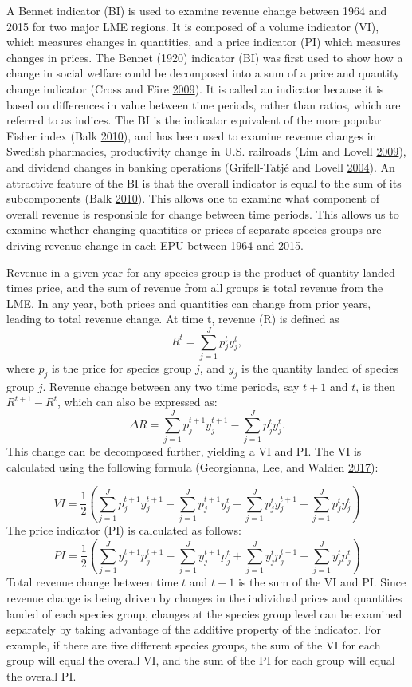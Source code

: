 \documentclass[
]{book}
\begin{document}
A Bennet indicator (BI) is used to examine revenue change between 1964 and 2015 for two major LME regions. It is composed of a volume indicator (VI), which measures changes in quantities, and a price indicator (PI) which measures changes in prices. The Bennet (1920) indicator (BI) was first used to show how a change in social welfare could be decomposed into a sum of a price and quantity change indicator (Cross and Färe \protect\hyperlink{ref-Cross2009}{2009}). It is called an indicator because it is based on differences in value between time periods, rather than ratios, which are referred to as indices. The BI is the indicator equivalent of the more popular Fisher index (Balk \protect\hyperlink{ref-Balk2010}{2010}), and has been used to examine revenue changes in Swedish pharmacies, productivity change in U.S. railroads (Lim and Lovell \protect\hyperlink{ref-lim2009}{2009}), and dividend changes in banking operations (Grifell-Tatjé and Lovell \protect\hyperlink{ref-Grifell-Tatje2004}{2004}). An attractive feature of the BI is that the overall indicator is equal to the sum of its subcomponents (Balk \protect\hyperlink{ref-Balk2010}{2010}). This allows one to examine what component of overall revenue is responsible for change between time periods. This allows us to examine whether changing quantities or prices of separate species groups are driving revenue change in each EPU between 1964 and 2015.

Revenue in a given year for any species group is the product of quantity landed times price, and the sum of revenue from all groups is total revenue from the LME. In any year, both prices and quantities can change from prior years, leading to total revenue change. At time t, revenue (R) is defined as \[R^{t} = \sum_{j=1}^{J}p_{j}^{t}y_{j}^{t},\]
where \(p_{j}\) is the price for species group \(j\), and \(y_{j}\) is the quantity landed of species group \(j\). Revenue change between any two time periods, say \(t+1\) and \(t\), is then \(R^{t+1}-R^{t}\), which can also be expressed as:
\[\Delta R = \sum_{j=1}^{J}p_{j}^{t+1}y_{j}^{t+1}-\sum_{j=1}^{J}p_{j}^{t}y_{j}^{t}.\]
This change can be decomposed further, yielding a VI and PI. The VI is calculated using the following formula (Georgianna, Lee, and Walden \protect\hyperlink{ref-Georgianna2017}{2017}):

\[VI = \frac{1}{2}(\sum_{j=1}^{J}p_{j}^{t+1}y_{j}^{t+1} - \sum_{j=1}^{J}p_{j}^{t+1}y_{j}^{t} + \sum_{j=1}^{J}p_{j}^{t}y_{j}^{t+1} - \sum_{j=1}^{J}p_{j}^{t}y_{j}^{t})\]
The price indicator (PI) is calculated as follows:
\[PI = \frac{1}{2}(\sum_{j=1}^{J}y_{j}^{t+1}p_{j}^{t+1} - \sum_{j=1}^{J}y_{j}^{t+1}p_{j}^{t} + \sum_{j=1}^{J}y_{j}^{t}p_{j}^{t+1} - \sum_{j=1}^{J}y_{j}^{t}p_{j}^{t})\]
Total revenue change between time \(t\) and \(t+1\) is the sum of the VI and PI. Since revenue change is being driven by changes in the individual prices and quantities landed of each species group, changes at the species group level can be examined separately by taking advantage of the additive property of the indicator. For example, if there are five different species groups, the sum of the VI for each group will equal the overall VI, and the sum of the PI for each group will equal the overall PI.
\end{document}
